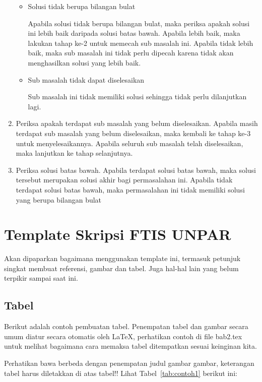 \begin{enumerate}
\begin{itemize}
		\item Solusi tidak berupa bilangan bulat

		Apabila solusi tidak berupa bilangan bulat, maka periksa apakah solusi ini lebih baik daripada solusi batas bawah. Apabila lebih baik, maka lakukan tahap ke-2 untuk memecah sub masalah ini. Apabila tidak lebih baik, maka sub masalah ini tidak perlu dipecah karena tidak akan menghasilkan solusi yang lebih baik.
		
		\item Sub masalah tidak dapat diselesaikan
		
		Sub masalah ini tidak memiliki solusi sehingga tidak perlu dilanjutkan lagi.
		
	\end{itemize}
	
	\item Periksa apakah terdapat sub masalah yang belum diselesaikan. Apabila masih terdapat sub masalah yang belum diselesaikan, maka kembali ke tahap ke-3 untuk menyelesaikannya. Apabila seluruh sub masalah telah diselesaikan, maka lanjutkan ke tahap selanjutnya.
	
	\item Periksa solusi batas bawah. Apabila terdapat solusi batas bawah, maka solusi tersebut merupakan solusi akhir bagi permasalahan ini. Apabila tidak terdapat solusi batas bawah, maka permasalahan ini tidak memiliki solusi yang berupa bilangan bulat
	 	
\end{enumerate}

\section{Template Skripsi FTIS UNPAR}
\label{sec:template}
 
Akan dipaparkan bagaimana menggunakan template ini, termasuk petunjuk singkat membuat referensi, gambar dan tabel.
Juga hal-hal lain yang belum terpikir sampai saat ini. 
 

\subsection{Tabel}  
Berikut adalah contoh pembuatan tabel. 
Penempatan tabel dan gambar secara umum diatur secara otomatis oleh \LaTeX{}, perhatikan contoh di file bab2.tex untuk melihat bagaimana cara memaksa tabel ditempatkan sesuai keinginan kita.

Perhatikan bawa berbeda dengan penempatan judul gambar gambar, keterangan tabel harus diletakkan di atas tabel!!
Lihat Tabel~\ref{tab:contoh1} berikut ini:

